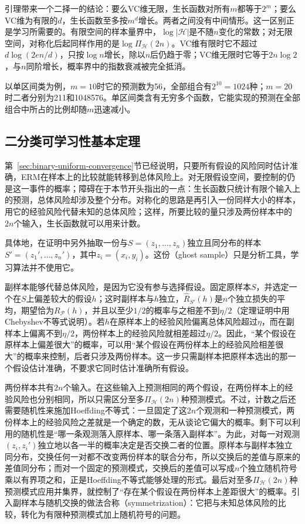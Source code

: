 引理带来一个二择一的结论：要么VC维无限，生长函数对所有$m$都等于$2^m$；要么VC维为有限的$d$，生长函数至多按$m^d$增长。两者之间没有中间情形。这一区别正是学习所需要的。有限空间的样本量界中，$\log|\mathcal H|$是不随$n$变化的常数；对无限空间，对称化后起同样作用的是$\log\Pi_{\mathcal H}(2n)$。VC维有限时它不超过$d\log(2en/d)$，只按$\log n$增长，除以$n$后仍趋于零；VC维无限时它等于$2n\log2$，与$n$同阶增长，概率界中的指数衰减被完全抵消。

以单区间类为例，$m=10$时它的预测数为56，全部组合有$2^{10}=1024$种；$m=20$时二者分别为211和1048576。单区间类含有无穷多个函数，它能实现的预测在全部组合中所占的比例却随$m$迅速减小。

\subsection{二分类可学习性基本定理}
\label{sec:binary-learnability-characterization}

第~\ref{sec:binary-uniform-convergence}节已经说明，只要所有假设的风险同时估计准确，ERM在样本上的比较就能转移到总体风险上。对无限假设空间，要控制的仍是这一事件的概率；障碍在于本节开头指出的一点：生长函数只统计有限个输入上的预测，总体风险却涉及整个分布。对称化的思路是再引入一份同样大小的样本，用它的经验风险代替未知的总体风险；这样，所要比较的量只涉及两份样本中的$2n$个输入，生长函数就可以用来计数。

具体地，在证明中另外抽取一份与$S=(z_1,\ldots,z_n)$独立且同分布的样本$S'=(z_1',\ldots,z_n')$，其中$z_i=(x_i,y_i)$。这份（ghost sample）只是分析工具，学习算法并不使用它。

副样本能够代替总体风险，是因为它没有参与选择假设。固定原样本$S$，并选定一个在$S$上偏差较大的假设$h$；这时副样本与$h$独立，$\hat R_{S'}(h)$是$n$个独立损失的平均，期望恰为$R_{\mathcal P}(h)$，并且以至少$1/2$的概率与之相差不到$\eta/2$（定理证明中用Chebyshev不等式说明）。若$h$在原样本上的经验风险偏离总体风险超过$\eta$，而在副样本上偏离不到$\eta/2$，两份样本上的经验风险就相差超过$\eta/2$。因此，“某个假设在原样本上偏差很大”的概率，可以用“某个假设在两份样本上的经验风险相差很大”的概率来控制，后者只涉及两份样本。这一步只需副样本把原样本选出的那一个假设估计准确，不要求它同时估计准确所有假设。

两份样本共有$2n$个输入。在这些输入上预测相同的两个假设，在两份样本上的经验风险也分别相同，所以只需区分至多$\Pi_{\mathcal H}(2n)$种预测模式。不过，计数之后还需要随机性来施加Hoeffding不等式：一旦固定了这$2n$个观测和一种预测模式，两份样本上的经验风险之差就是一个确定的数，无从谈论它偏大的概率。剩下可以利用的随机性是“哪一条观测落入原样本、哪一条落入副样本”。为此，对每一对观测$(z_i,z_i')$独立地以各一半的概率决定是否交换二者的位置。原样本与副样本独立同分布，交换任何一对都不改变两份样本的联合分布，所以交换后的差值与原来的差值同分布；而对一个固定的预测模式，交换后的差值可以写成$n$个独立随机符号乘以有界项之和，正是Hoeffding不等式能够处理的形式。最后对至多$\Pi_{\mathcal H}(2n)$种预测模式应用并集界，就控制了“存在某个假设在两份样本上差距很大”的概率。引入副样本与随机交换的做法合称（symmetrization）：它把与未知总体风险的比较，转化为有限种预测模式加上随机符号的问题。

